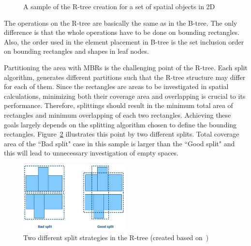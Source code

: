 \documentclass[a4paper,12pt]{article}
\begin{document}
\begin{figure}
\centering
{}
\centering
{}
\caption{A sample of the R-tree creation for a set of spatial objects in 2D}
\label{rtree}
\end{figure}

The operations on the R-tree are basically the same as in the B-tree. The only difference is that the 
whole operations have to be done on bounding rectangles.
Also, the order used in the element placement in B-tree
is the set inclusion order on bounding rectangles and shapes in leaf nodes. 

Partitioning the area with MBRs is the challenging point of the R-tree. Each split algorithm, generates different partitions such that the R-tree structure may differ for each of them. Since the rectangles are areas to be investigated in spatial calculations, minimizing both their coverage area and overlapping is crucial to its performance. Therefore, splittings should result in the minimum total area of rectangles and minimum overlapping of each two rectangles. 
Achieving these goals largely depends on the splitting algorithm chosen to define the bounding rectangles. Figure~\ref{rtreesplit} illustrates this point by two different splits. Total coverage area of the ``Bad split" case in this sample is larger than the ``Good split" and this will lead to unnecessary investigation of empty spaces.

\begin{figure}
\centering
\includegraphics[width=0.5\textwidth,height=0.17\textheight]{R-treeMBR}
\caption{Two different split strategies in the R-tree (created based on~\cite{rtree})}
\label{rtreesplit}
\end{figure}
\end{document}
